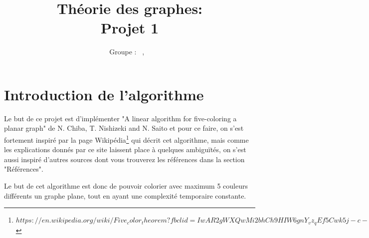 \documentclass[a4paper, 11pt, oneside]{article}
\title{Théorie des graphes: \\ Projet 1\intitule}
\author{Groupe \GrNbr : \PrenomUN~\textsc{\NomUN}, \PrenomDEUX~\textsc{\NomDEUX}}
\date{}
\begin{document}
	\maketitle
	
	\newpage
	
	\section{Introduction de l'algorithme}
	Le but de ce projet est d'implémenter "A linear algorithm for five-coloring a planar graph" de N. Chiba, T. Nishizeki and N. Saito et pour ce faire, on s'est fortement inspiré par la page Wikipédia\footnote{$https://en.wikipedia.org/wiki/Five_color_theorem?fbclid=IwAR2gWXQwMi2bhCh9HIW6gnY_vz_qEf5Cwk5j-c-YYZk23LTf-KPZSMsBNJY$} qui décrit cet algorithme, mais comme les explications donnés par ce site laissent place à quelques ambiguïtés, on s'est aussi inspiré d'autres sources dont vous trouverez les références dans la section "Références".
	\par Le but de cet algorithme est donc de pouvoir colorier avec maximum 5 couleurs différents un graphe plane, tout en ayant une complexité temporaire constante.
	\newpage
\end{document}
